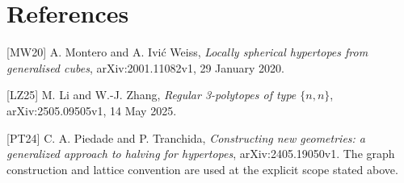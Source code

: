 \section*{References}
{[}MW20{]} A. Montero and A. Ivi\'c Weiss,
\emph{Locally spherical hypertopes from generalised cubes},
arXiv:2001.11082v1, 29 January 2020.

{[}LZ25{]} M. Li and W.-J. Zhang,
\emph{Regular 3-polytopes of type $\{n,n\}$},
arXiv:2505.09505v1, 14 May 2025.

{[}PT24{]} C. A. Piedade and P. Tranchida,
\emph{Constructing new geometries: a generalized approach to halving
for hypertopes}, arXiv:2405.19050v1. The graph construction and lattice
convention are used at the explicit scope stated above.

